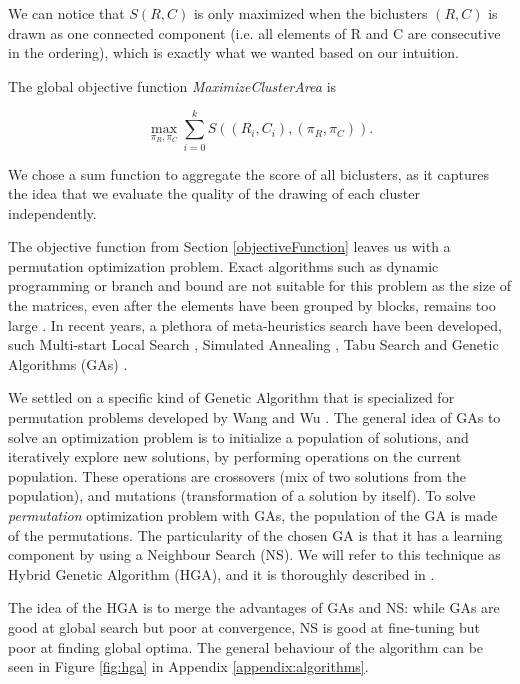 \documentclass[twoside,leqno,twocolumn]{article}
\theoremstyle{definition}
\begin{document}
\noindent We can notice that $S(R,C)$ is only maximized when the biclusters $(R,C)$ is drawn as one connected component (i.e. all elements of R and C are consecutive in the ordering), which is exactly what we wanted based on our intuition.

\medskip

\noindent The global objective function \textit{MaximizeClusterArea} is

$$
\max _{\pi_R, \pi_C} \sum_{i=0}^{k}S((R_i,C_i),(\pi_R,\pi_C)).
$$

\noindent  We chose a sum function to aggregate the score of all biclusters, as it captures the idea that we evaluate the quality of the drawing of each cluster independently.

\noindent The objective function from Section \ref{objectiveFunction} leaves us with a permutation optimization problem. Exact algorithms such as dynamic programming or branch and bound are not suitable for this problem as the size of the matrices, even after the elements have been grouped by blocks, remains too large \cite{hahsler2008getting}. In recent years, a plethora of meta-heuristics search have been developed, such Multi-start
Local Search \cite{localSearch}, Simulated Annealing \cite{SA}, Tabu Search \cite{tabu} and Genetic Algorithms (GAs)
 \cite{optimizationbook}.

\medskip

\noindent  We settled on a specific kind of Genetic Algorithm that is specialized for permutation problems developed by Wang and Wu \cite{Wang2004HybridGA}. The general idea of GAs to solve an optimization problem is to initialize a population of solutions, and iteratively explore new solutions, by performing operations on the current population. These operations are crossovers (mix of two solutions from the population), and mutations (transformation of a solution by itself). To solve \emph{permutation} optimization problem with GAs, the population of the GA is made of the permutations. The particularity of the chosen GA is that it has a learning component by using a Neighbour Search (NS). We will refer to this technique as Hybrid Genetic Algorithm (HGA), and it is thoroughly described in \cite{Wang2004HybridGA}.

 \medskip

 \noindent The idea of the HGA is to merge the advantages of GAs and NS: while GAs are good at global search but poor at convergence, NS is good at fine-tuning but poor at finding global optima. The general behaviour of the algorithm can be seen in Figure \ref{fig:hga} in Appendix \ref{appendix:algorithms}.
\end{document}

